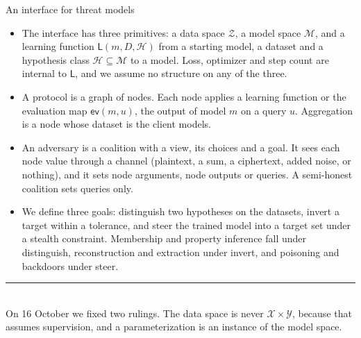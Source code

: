 \documentclass[aspectratio=169,10pt]{beamer}
\newcommand{\redline}{\textcolor{kred}{\rule{\textwidth}{1pt}}}
\newcommand{\Z}{\mathcal{Z}}
\newcommand{\Mc}{\mathcal{M}}
\newcommand{\Hc}{\mathcal{H}}
\newcommand{\Lf}{\mathsf{L}}
\newcommand{\ev}{\mathsf{ev}}
\begin{document}
\begin{frame}{An interface for threat models}
  \small
  \begin{itemize}
    \item The interface has three primitives: a data space $\Z$, a model space $\Mc$, and a learning function $\Lf(m, D, \Hc)$ from a starting model, a dataset and a hypothesis class $\Hc\subseteq\Mc$ to a model. Loss, optimizer and step count are internal to $\Lf$, and we assume no structure on any of the three.
    \item A protocol is a graph of nodes. Each node applies a learning function or the evaluation map $\ev(m,u)$, the output of model $m$ on a query $u$. Aggregation is a node whose dataset is the client models.
    \item An adversary is a coalition with a view, its choices and a goal. It sees each node value through a channel (plaintext, a sum, a ciphertext, added noise, or nothing), and it sets node arguments, node outputs or queries. A semi-honest coalition sets queries only.
    \item We define three goals: distinguish two hypotheses on the datasets, invert a target within a tolerance, and steer the trained model into a target set under a stealth constraint. Membership and property inference fall under distinguish, reconstruction and extraction under invert, and poisoning and backdoors under steer.
  \end{itemize}
  \vspace{0.4em}
  \redline\\[0.4em]
  On 16 October we fixed two rulings. The data space is never $\mathcal{X}\times\mathcal{Y}$, because that assumes supervision, and a parameterization is an instance of the model space.
\end{frame}
\end{document}
